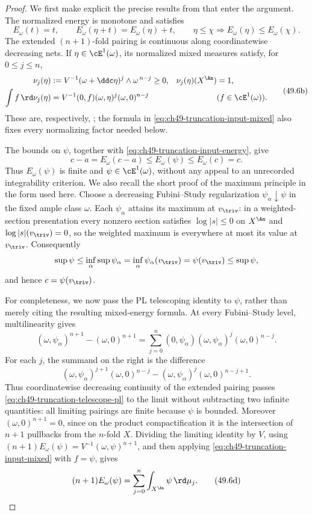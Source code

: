 \begin{proof}
We first make explicit the precise results from
 that enter the argument.  The
normalized energy is monotone and satisfies
\[
 E_\omega(t)=t,
 \qquad
 E_\omega(\eta+t)=E_\omega(\eta)+t,
 \qquad
 \eta\le\chi\Longrightarrow E_\omega(\eta)\le E_\omega(\chi).
\tag{49.6a}\label{eq:ch49-truncation-input-energy}
\]
The extended $(n+1)$-fold pairing is continuous along coordinatewise
decreasing nets.  If $\eta\in\cE^1(\omega)$, its normalized mixed
measures satisfy, for $0\le j\le n$,
\[
 \begin{aligned}
 \nu_j(\eta)&:=V^{-1}(\omega+\ddc\eta)^j\wedge\omega^{\,n-j}\ge0,
 &\nu_j(\eta)(X^{\An})&=1,\\
 \int f\,\rd\nu_j(\eta)
 &=V^{-1}(0,f)(\omega,\eta)^j(\omega,0)^{n-j}
 &&(f\in\cE^1(\omega)).
 \end{aligned}
\tag{49.6b}\label{eq:ch49-truncation-input-mixed}
\]
These are, respectively,
;
the formula in \eqref{eq:ch49-truncation-input-mixed} also fixes every
normalizing factor needed below.

The bounds on $\psi$, together with
\eqref{eq:ch49-truncation-input-energy}, give
\[
 c-a=E_\omega(c-a)\le E_\omega(\psi)\le E_\omega(c)=c.
\]
Thus $E_\omega(\psi)$ is finite and
$\psi\in\cE^1(\omega)$, without any appeal to an unrecorded
integrability criterion.  We also recall the short proof of the maximum
principle in the form used here.  Choose a decreasing Fubini--Study
regularization $\psi_\alpha\downarrow\psi$ in the fixed ample class
$\omega$.  Each $\psi_\alpha$ attains its maximum at
$v_{\triv}$: in a weighted-section presentation every nonzero section
satisfies $\log|s|\le0$ on $X^{\An}$ and
$\log|s|(v_{\triv})=0$, so the weighted maximum is everywhere at most
its value at $v_{\triv}$.  Consequently
\[
 \sup\psi\le\inf_\alpha\sup\psi_\alpha
 =\inf_\alpha\psi_\alpha(v_{\triv})
 =\psi(v_{\triv})\le\sup\psi,
\]
and hence $c=\psi(v_{\triv})$.

For completeness, we now pass the PL telescoping identity to $\psi$,
rather than merely citing the resulting mixed-energy formula.  At every
Fubini--Study level, multilinearity gives
\[
 (\omega,\psi_\alpha)^{n+1}-(\omega,0)^{n+1}
 =\sum_{j=0}^n
   (0,\psi_\alpha)(\omega,\psi_\alpha)^j(\omega,0)^{n-j}.
\tag{49.6c}\label{eq:ch49-truncation-telescope-pl}
\]
For each $j$, the summand on the right is the difference
\[
 (\omega,\psi_\alpha)^{j+1}(\omega,0)^{n-j}
 -(\omega,\psi_\alpha)^j(\omega,0)^{n-j+1}.
\]
Thus coordinatewise decreasing continuity of the extended pairing passes
\eqref{eq:ch49-truncation-telescope-pl} to the limit without subtracting
two infinite quantities: all limiting pairings are finite because
$\psi$ is bounded.  Moreover $(\omega,0)^{n+1}=0$, since on the
product compactification it is the intersection of $n+1$ pullbacks from
the $n$-fold $X$.  Dividing the limiting
identity by $V$, using
$(n+1)E_\omega(\psi)=V^{-1}(\omega,\psi)^{n+1}$, and then applying
\eqref{eq:ch49-truncation-input-mixed} with $f=\psi$, gives
\[
 (n+1)E_\omega(\psi)
 =\sum_{j=0}^n\int_{X^{\An}}\psi\,\rd\mu_j .
\tag{49.6d}\label{eq:ch49-truncation-mixed-energy}
\]


\end{proof}

